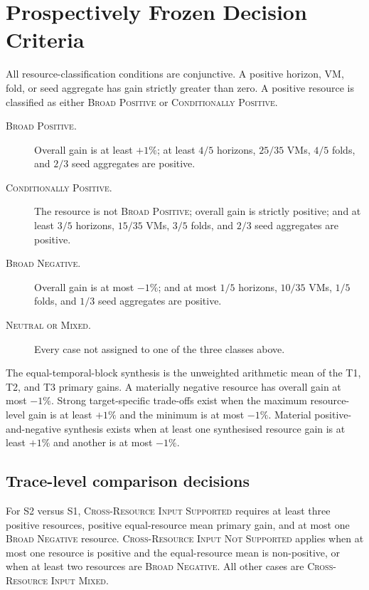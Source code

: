 \section*{Prospectively Frozen Decision Criteria}

All resource-classification conditions are conjunctive.  A positive horizon,
VM, fold, or seed aggregate has gain strictly greater than zero.  A positive
resource is classified as either \textsc{Broad Positive} or
\textsc{Conditionally Positive}.

\begin{description}
  \item[\textsc{Broad Positive}.] Overall gain is at least $+1\%$; at least
    $4/5$ horizons, $25/35$ VMs, $4/5$ folds, and $2/3$ seed aggregates are
    positive.
  \item[\textsc{Conditionally Positive}.] The resource is not \textsc{Broad
    Positive}; overall gain is strictly positive; and at least $3/5$ horizons,
    $15/35$ VMs, $3/5$ folds, and $2/3$ seed aggregates are positive.
  \item[\textsc{Broad Negative}.] Overall gain is at most $-1\%$; and at most
    $1/5$ horizons, $10/35$ VMs, $1/5$ folds, and $1/3$ seed aggregates are
    positive.
  \item[\textsc{Neutral or Mixed}.] Every case not assigned to one of the three
    classes above.
\end{description}

The equal-temporal-block synthesis is the unweighted arithmetic mean of the T1,
T2, and T3 primary gains.  A materially negative resource has overall gain at
most $-1\%$.  Strong target-specific trade-offs exist when the maximum
resource-level gain is at least $+1\%$ and the minimum is at most $-1\%$.
Material positive-and-negative synthesis exists when at least one synthesised
resource gain is at least $+1\%$ and another is at most $-1\%$.

\subsection*{Trace-level comparison decisions}

For S2 versus S1, \textsc{Cross-Resource Input Supported} requires at least
three positive resources, positive equal-resource mean primary gain, and at
most one \textsc{Broad Negative} resource.  \textsc{Cross-Resource Input Not
Supported} applies when at most one resource is positive and the equal-resource
mean is non-positive, or when at least two resources are \textsc{Broad
Negative}.  All other cases are \textsc{Cross-Resource Input Mixed}.

